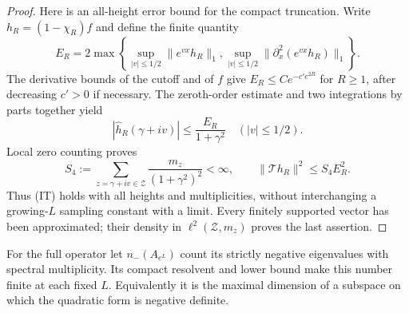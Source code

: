 \documentclass[11pt]{article}
\theoremstyle{remark}\newtheorem{remark}[theorem]{Remark}
\begin{document}
\begin{proof}
Here is an all-height error bound for the compact truncation.
Write $h_R=(1-\chi_R)f$ and define the finite quantity
\[
 E_R=2\max\left\{
  \sup_{|v|\le1/2}\|e^{vx}h_R\|_1,
  \sup_{|v|\le1/2}\|\partial_x^2(e^{vx}h_R)\|_1\right\}.
\]
The derivative bounds of the cutoff and of $f$ give
$E_R\le C e^{-c' e^{2R}}$ for $R\ge1$, after decreasing
$c'>0$ if necessary. The zeroth-order estimate and two
integrations by parts together yield
\[
 |\widehat h_R(\gamma+iv)|\le\frac{E_R}{1+\gamma^2}
                              \quad(|v|\le1/2).
\]
Local zero counting proves
\[
 S_4:=\sum_{z=\gamma+iv\in\mathcal Z}
                 \frac{m_z}{(1+\gamma^2)^2}<\infty,
 \qquad \|\mathcal T h_R\|^2\le S_4 E_R^2.             \tag{TE}
\]
Thus (IT) holds with all heights and multiplicities, without
interchanging a growing-$L$ sampling constant with a limit.
Every finitely supported vector has been approximated;
their density in $\ell^2(\mathcal Z,m_z)$ proves the last assertion.
\end{proof}

For the full operator let $n_-(A_{e^L})$ count its strictly
negative eigenvalues with spectral multiplicity. Its compact
resolvent and lower bound make this number finite at each fixed $L$.
Equivalently it is the maximal dimension of a subspace on which
the quadratic form is negative definite.
\end{document}
